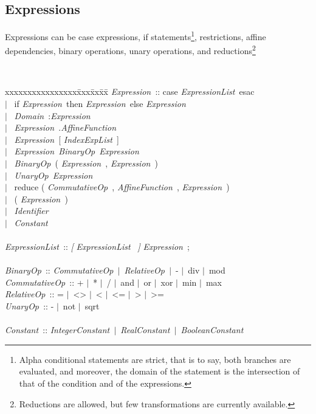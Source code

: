\documentclass[12pt]{article}
\newcommand{\Alpha}{{\sc Alpha}}
\newcommand{\alfa}{\Alpha}
\newcommand{\Opt}[1]{{\rm\sl [} #1 {\rm\sl ]}}
\newcommand{\Alt}{$\mid$}
\newcommand{\Domain}{{\sl Domain\ }}
\newcommand{\Identifier}{{\sl Identifier\ }}
\newcommand{\AffineFunction}{{\sl AffineFunction\ }}
\newcommand{\IndexExpList}{{\sl IndexExpList\ }}
\newcommand{\ExpressionList}{{\sl ExpressionList\ }}
\newcommand{\Expression}{{\sl Expression\ }}
\newcommand{\Constant}{{\sl Constant\ }}
\newcommand{\IntegerConstant}{{\sl IntegerConstant\ }}
\newcommand{\RealConstant}{{\sl RealConstant\ }}
\newcommand{\BooleanConstant}{{\sl BooleanConstant\ }}
\newcommand{\BinaryOp}{{\sl BinaryOp\ }}
\newcommand{\CommutativeOp}{{\sl CommutativeOp\ }}
\newcommand{\RelativeOp}{{\sl RelativeOp\ }}
\newcommand{\UnaryOp}{{\sl UnaryOp\ }}
\begin{document}
\subsection{Expressions}
Expressions can be case expressions, if statements\footnote{\alfa{}
conditional statements are strict, that is to say, both branches
are evaluated, and moreover, the domain of the statement is 
the intersection of that of the condition and of the 
expressions.}, restrictions, affine dependencies, binary operations, 
unary operations, and reductions\footnote{Reductions are allowed, 
but few transformations are currently available.}
{\tt
\begin{tabbing}
xxxxxxxxxxxxxxxx\= xxx\= xx\=  xx\= \kill
\Expression\>::\>\> case \ExpressionList esac \\
\>\> \Alt\ \> if \Expression then \Expression else \Expression\\
\>\> \Alt\ \> \Domain :\Expression\\
\>\> \Alt\ \> \Expression .\AffineFunction\\
\>\> \Alt\ \> \Expression [ \IndexExpList ] \\
\>\> \Alt\ \> \Expression \BinaryOp \Expression\\
\>\> \Alt\ \> \BinaryOp ( \Expression, \Expression ) \\
\>\> \Alt\ \> \UnaryOp \Expression\\
\>\> \Alt\ \> reduce ( \CommutativeOp, \AffineFunction, \Expression ) \\
\>\> \Alt\ \> ( \Expression ) \\
\>\> \Alt\ \> \Identifier\\
\>\> \Alt\ \> \Constant\\
\\
\ExpressionList \>::\>\> \Opt{ \ExpressionList  } \Expression ;\\
\\
\BinaryOp \>::\>\> \CommutativeOp \Alt\ \RelativeOp \Alt\ - \Alt\ div \Alt\ mod\\
\CommutativeOp \>::\>\> + \Alt\ * \Alt\ / \Alt\ and \Alt\ or \Alt\ xor \Alt\ min \Alt\ max\\
\RelativeOp \>::\>\> = \Alt\ <> \Alt\ < \Alt\ <= \Alt\ > \Alt\ >=\\
\UnaryOp \>::\>\> - \Alt\ not \Alt\ sqrt\\
\\
\Constant \>::\>\> \IntegerConstant \Alt\ \RealConstant \Alt\ \BooleanConstant\\
\end{tabbing}
}
\end{document}
